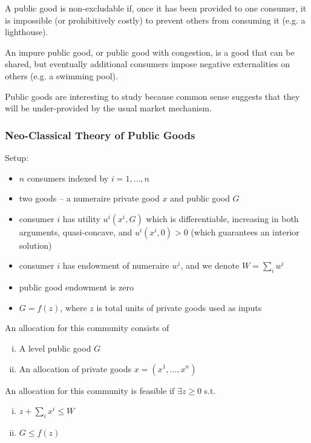 \begin{definition}[Excludability]
  A public good is non-excludable if, once it has been provided to one
  consumer, it is impossible (or prohibitively costly) to prevent
  others from consuming it (e.g. a lighthouse). 
\end{definition}

\begin{definition}
  An impure public good, or public good with congestion, is a good
  that can be shared, but eventually additional consumers impose
  negative externalities on others (e.g. a swimming pool).
\end{definition}

Public goods are interesting to study because common sense suggests
that they will be under-provided by the usual market mechanism.

\subsubsection{Neo-Classical Theory of Public Goods}

Setup:
\begin{itemize}
\item $n$ consumers indexed by $i = 1, \dots, n$
\item two goods -- a numeraire private good $x$ and public good $G$
\item consumer $i$ has utility $u^i(x^i, G)$ which is differentiable,
  increasing in both arguments, quasi-concave, and $u^i(x^i, 0) > 0$
  (which guarantees an interior solution)
\item consumer $i$ has endowment of numeraire $w^i$, and we denote $W
  = \sum_i w^i$
\item public good endowment is zero
\item $G = f(z)$, where $z$ is total units of private goods used as
  inputs
\end{itemize}

\begin{definition}[Allocation]
  An allocation for this community consists of
  \begin{enumerate}[(i)]
  \item A level public good $G$
  \item An allocation of private goods $x = (x^1, \dots, x^n)$
  \end{enumerate}
\end{definition}

\begin{definition}[Feasible]
  An allocation for this community is feasible if $\exists z \geq 0$ s.t.
  \begin{enumerate}[(i)]
  \item $z + \sum_i x^i \leq W$
  \item $G \leq f(z)$
  \end{enumerate}
\end{definition}


